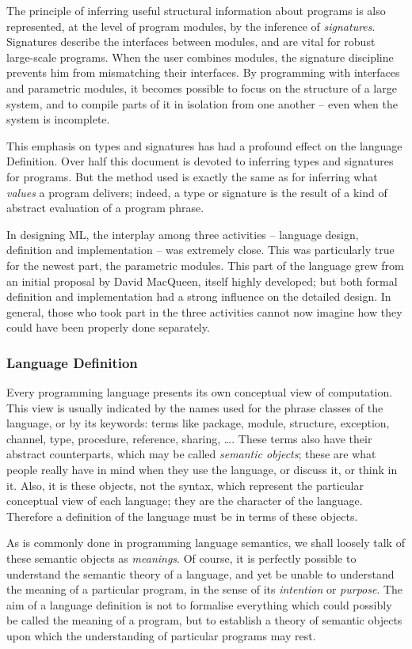 The principle of inferring useful structural information about programs
is also represented, at the level of program modules, by the inference of 
{\sl signatures}.
Signatures describe the interfaces between modules, and are vital for robust
large-scale programs.  When the user combines modules, the signature
discipline prevents him from mismatching their interfaces.  By programming
with interfaces and parametric modules, it becomes possible to focus on the
structure of a large system, and to compile parts of it in isolation from
one another -- even when the system is incomplete.

This emphasis on types and signatures has had a profound effect on the 
language Definition. Over half this document is devoted to inferring types 
and signatures for programs.  But the method used is exactly the same as for 
inferring what {\sl values} a program delivers; indeed, a type or signature is 
the result of a kind of abstract evaluation of a program phrase. 

In designing ML, 
the interplay among three activities -- language design, definition and 
implementation -- was extremely close. This was particularly true for the
newest part, the parametric modules. This part of the language grew from an 
initial proposal by David MacQueen, itself highly developed; but both 
formal definition and implementation had a strong influence on the detailed
design.  In general, those who took part in the three activities cannot now 
imagine how they could have been properly done separately.  

\subsubsection*{Language Definition}
Every programming language presents  its own conceptual view of 
computation.  This view is usually indicated by the names used for the phrase 
classes of the language, or by its keywords: terms like package, module, 
structure, exception, channel, type, procedure, reference, sharing, \ldots. 
These terms also have their abstract counterparts,  which may be called
{\sl semantic objects}; these are what people really have in mind when they use
the language, or discuss it, or think in it.  Also, it is these objects,
not the syntax, which represent the particular conceptual view of each
language; they are the character of the language.  Therefore a definition
of the language must be in terms of these objects.  

As is commonly done in programming language semantics, we shall loosely
talk of these semantic objects as {\sl meanings}. Of course, it is 
perfectly possible to understand the semantic theory of a language, and
yet be unable to understand the meaning of a particular program, in the
sense of its {\sl intention} or {\sl purpose}.  The aim of a language
definition is not to formalise everything which could possibly be called the
meaning of a program, but to establish a theory of semantic objects  
upon which the understanding of particular programs may rest.

